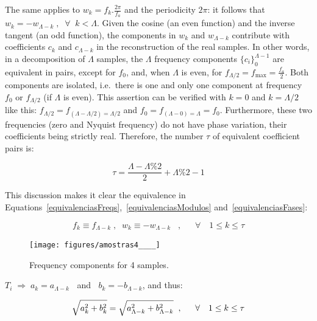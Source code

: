 The same applies to $w_k=f_k.\frac{2\pi}{f_a}$ and the periodicity $2\pi$: it follows that $w_k=-w_{\Lambda-k} \; ,\;\; \forall \;\; k<\Lambda$. Given the cosine (an even function) and the inverse tangent (an odd function), the components in $w_k$ and $w_{\Lambda-k}$ contribute with coefficients $c_k$ and $c_{\Lambda-k}$ in the reconstruction of the real samples. In other words, in a decomposition of $\Lambda$ samples, the $\Lambda$ frequency components $\{c_i\}_0^{\Lambda-1}$ are equivalent in pairs,
except for $f_0$, and, when $\Lambda$ is even, for $f_{\Lambda/2}=f_{\text{max}}=\frac{f_a}{2}$. Both components are isolated, i.e.\ there is one and only one component at frequency $f_0$ or $f_{\Lambda/2}$ (if $\Lambda$ is even). This assertion can be verified with $k=0$ and $k=\Lambda/2$ like this: $f_{\Lambda/2}=f_{(\Lambda-\Lambda/2) = \Lambda/2}$ and $f_0=f_{(\Lambda-0)=\Lambda}=f_0$.
Furthermore, these two frequencies (zero and Nyquist frequency) do not have phase variation, their coefficients being strictly real. Therefore, the number $\tau$ of equivalent coefficient pairs is:

\begin{equation}\label{coefsPareados}
\tau = \frac{\Lambda - \Lambda \% 2}{2} +\Lambda \% 2 -1
\end{equation}

This discussion makes it clear the equivalence in Equations~\ref{equivalenciasFreqs},~\ref{equivalenciasModulos} and~\ref{equivalenciasFases}:

\begin{equation}\label{equivalenciasFreqs}
f_{k}\equiv f_{\Lambda-k}\;, \;\; w_{k}\equiv-w_{\Lambda-k}\;\;\;, \quad \;\; \forall \quad 1 \leq k \leq \tau  
\end{equation}

\begin{figure}
    \centering
        \texttt{[image: figures/amostras4\_\_\_\_]}
    \caption{Frequency components for 4 samples.}
        \label{fig:amostras4}
\end{figure}

$T_i \; \Rightarrow \; a_k = a_{\Lambda -k}\;\;$ and $\;\;b_k = - b_{\Lambda -k}$, and thus:

\begin{equation}\label{equivalenciasModulos}
\sqrt{a_k^2 + b_k^2} = \sqrt{a_{\Lambda - k}^2 + b_{\Lambda -k}^2} \;\;, \quad \;\; \forall \quad 1 \leq k \leq \tau  \\
\end{equation}

